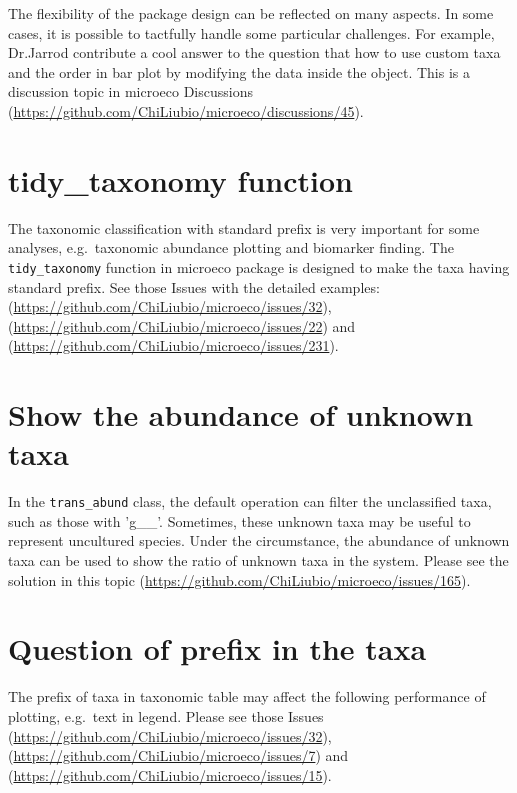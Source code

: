 \documentclass[
]{book}
\begin{document}
The flexibility of the package design can be reflected on many aspects.
In some cases, it is possible to tactfully handle some particular challenges.
For example, Dr.Jarrod contribute a cool answer to the question that how to use custom taxa and the order in bar plot by modifying the data inside the object.
This is a discussion topic in microeco Discussions (\url{https://github.com/ChiLiubio/microeco/discussions/45}).

\hypertarget{tidy_taxonomy-function}{%
\section{tidy\_taxonomy function}\label{tidy_taxonomy-function}}

The taxonomic classification with standard prefix is very important for some analyses,
e.g.~taxonomic abundance plotting and biomarker finding.
The \texttt{tidy\_taxonomy} function in microeco package is designed to make the taxa having standard prefix.
See those Issues with the detailed examples: (\url{https://github.com/ChiLiubio/microeco/issues/32}), (\url{https://github.com/ChiLiubio/microeco/issues/22})
and (\url{https://github.com/ChiLiubio/microeco/issues/231}).

\hypertarget{show-the-abundance-of-unknown-taxa}{%
\section{Show the abundance of unknown taxa}\label{show-the-abundance-of-unknown-taxa}}

In the \texttt{trans\_abund} class, the default operation can filter the unclassified taxa, such as those with 'g\_\_'.
Sometimes, these unknown taxa may be useful to represent uncultured species.
Under the circumstance, the abundance of unknown taxa can be used to show the ratio of unknown taxa in the system.
Please see the solution in this topic (\url{https://github.com/ChiLiubio/microeco/issues/165}).

\hypertarget{question-of-prefix-in-the-taxa}{%
\section{Question of prefix in the taxa}\label{question-of-prefix-in-the-taxa}}

The prefix of taxa in taxonomic table may affect the following performance of plotting, e.g.~text in legend.
Please see those Issues (\url{https://github.com/ChiLiubio/microeco/issues/32}), (\url{https://github.com/ChiLiubio/microeco/issues/7})
and (\url{https://github.com/ChiLiubio/microeco/issues/15}).
\end{document}
